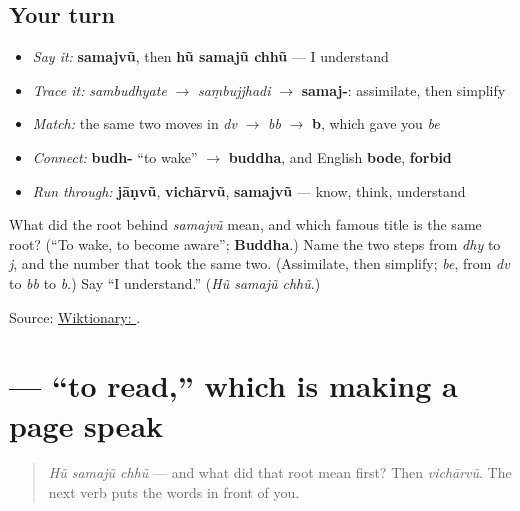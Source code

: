 \subsection*{Your turn}
\begin{itemize}
\raggedright
  \item \emph{Say it:} \textbf{samajvũ}, then \textbf{hũ samajũ chhũ} — I understand
  \item \emph{Trace it:} \emph{sambudhyate} $\to$ \emph{saṃbujjhadi} $\to$ \textbf{samaj-}: assimilate, then simplify
  \item \emph{Match:} the same two moves in \emph{dv} $\to$ \emph{bb} $\to$ \textbf{b}, which gave you \emph{be}
  \item \emph{Connect:} \textbf{budh-} \textquotedblleft{}to wake\textquotedblright{} $\to$ \textbf{buddha}, and English \textbf{bode}, \textbf{forbid}
  \item \emph{Run through:} \textbf{jāṇvũ}, \textbf{vichārvũ}, \textbf{samajvũ} — know, think, understand
\end{itemize}

\begin{tcolorbox}[breakable,colback=teal!4,colframe=teal!35!black,title={Before you move on}]
What did the root behind \emph{samajvũ} mean, and which famous title is the same root? (\textquotedblleft{}To wake, to become aware\textquotedblright{}; \textbf{Buddha}.) Name the two steps from \emph{dhy} to \emph{j}, and the number that took the same two. (Assimilate, then simplify; \emph{be}, from \emph{dv} to \emph{bb} to \emph{b}.) Say \textquotedblleft{}I understand.\textquotedblright{} (\emph{Hũ samajũ chhũ}.)

Source: \href{https://en.wiktionary.org/wiki/\%E0\%AA\%B8\%E0\%AA\%AE\%E0\%AA\%9C\%E0\%AA\%B5\%E0\%AB\%81\%E0\%AA\%82}{Wiktionary: }.
\end{tcolorbox}
\section[\texorpdfstring{\gu{વાંચવું} (vā̃chvũ)}{વાંચવું (vā̃chvũ)}]{ — \textquotedblleft{}to read,\textquotedblright{} which is making a page speak}

\label{lesson:GU-C08-vanchvun}



\begin{quote}
\emph{Hũ samajũ chhũ} — and what did that root mean first? Then \emph{vichārvũ}. The next verb puts the words in front of you.
\end{quote}

